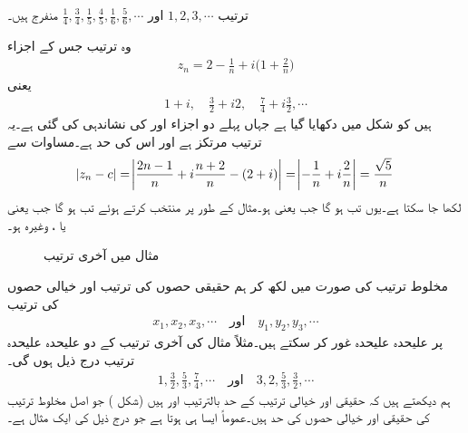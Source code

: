 ترتیب
$1,2,3,\cdots$
اور
$\tfrac{1}{4},\tfrac{3}{4},\tfrac{1}{5},\tfrac{4}{5},\tfrac{1}{6},\tfrac{5}{6},\cdots$
منفرج ہیں۔

وہ ترتیب جس کے اجزاء 
\begin{align*}
z_n=2-\frac{1}{n}+i\big(1+\frac{2}{n}\big)
\end{align*}
یعنی
\begin{align*}
1+i,\quad \frac{3}{2}+i2,\quad \frac{7}{4}+i\frac{3}{2},\cdots
\end{align*}
ہیں کو شکل  میں دکھایا گیا ہے جہاں پہلے دو اجزاء  اور  کی نشاندہی  کی گئی ہے۔یہ ترتیب مرتکز ہے اور اس کی حد  ہے۔مساوات  سے
\begin{align*}
\abs{z_n-c}=\abs{\frac{2n-1}{n}+i\frac{n+2}{n}-(2+i)}=\abs{-\frac{1}{n}+i\frac{2}{n}}=\frac{\sqrt{5}}{n}
\end{align*}
لکھا جا سکتا ہے۔یوں  تب ہو گا جب  یعنی  ہو۔مثال کے طور پر  منتخب کرتے ہوئے   تب ہو گا جب  یعنی
 یا ، وغیرہ ہو۔
\begin{figure}
\centering
{}
\caption{مثال  میں آخری ترتیب}
\label{شکل_مثال_ترتیب_مرتکز_اور_منفرج_ترتیب}
\end{figure}
مخلوط ترتیب  کی صورت میں  لکھ کر ہم حقیقی حصوں کی ترتیب اور خیالی حصوں کی ترتیب
\begin{align*}
x_1,x_2,x_3,\cdots\quad \text{اور}\quad y_1,y_2,y_3,\cdots
\end{align*}
 پر علیحدہ علیحدہ غور کر سکتے ہیں۔مثلاً  مثال  کی آخری ترتیب کے دو علیحدہ علیحدہ ترتیب درج ذیل ہوں گی۔
\begin{align*}
1,\frac{3}{2},\frac{5}{3},\frac{7}{4},\cdots \quad \text{اور}\quad 3,2,\frac{5}{3},\frac{3}{2},\cdots
\end{align*}
ہم دیکھتے ہیں کہ حقیقی اور خیالی ترتیب کے حد  بالترتیب  اور  ہیں (شکل ) جو اصل مخلوط ترتیب کی حقیقی اور خیالی حصوں کی حد ہیں۔عموماً ایسا ہی ہوتا ہے جو درج ذیل کی ایک مثال ہے۔ 

